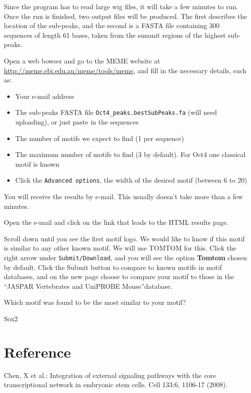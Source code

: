 \begin{information}
Since the program has to read large wig files, it will take a few minutes to
run. Once the run is finished, two output files will be produced. The first
describes the location of the sub-peaks, and the second is a FASTA file
containing 300 sequences of length 61 bases, taken from the summit regions of
the highest sub-peaks.
\end{information}

\begin{steps}
Open a web bowser and go to the MEME website at
\url{http://meme.ebi.edu.au/meme/tools/meme}, and fill in the necessary
details, such as:
\begin{itemize}
	\item Your e-mail address 
	\item The sub-peaks FASTA file \texttt{Oct4\_peaks.bestSubPeaks.fa} (will need uploading), or just paste in the sequences 
	\item The number of motifs we expect to find (1 per sequence) 
	\item The maximum number of motifs to find (3 by default). For Oct4 one classical motif is known 
	\item Click the \texttt{Advanced options}, the width of the desired motif (between 6 to 20)
\end{itemize}
\end{steps}

\begin{note}
You will receive the results by e-mail. This usually doesn't take more than a few minutes.
\end{note}

\begin{steps}
Open the e-mail and click on the link that leads to the HTML results page.

Scroll down until you see the first motif logo. We would like to know if this
motif is similar to any other known motif. We will use TOMTOM for this. Click the right arrow under \texttt{Submit/Download}, and you will see the option \textbf{Tomtom} chosen by default. Click the Submit
button to compare to known motifs in motif databases, and on the new page choose
to compare your motif to those in the ``JASPAR Vertebrates and UniPROBE Mouse''database.
\end{steps}


\begin{questions}
Which motif was found to be the most similar to your motif?
\begin{answer}
Sox2
\end{answer}
\end{questions}

\newpage
\section{Reference}
Chen, X et al.: Integration of external signaling pathways with the core transcriptional network in embryonic stem cells. Cell 133:6, 1106-17 (2008).
